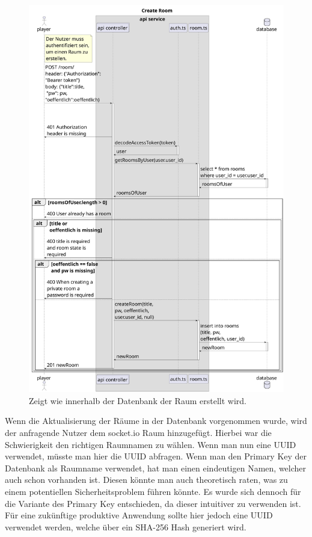 \documentclass[
]{article}
\begin{document}
\begin{figure}[H]
	\centering
	\includegraphics[width=\textwidth ]{resources/create_room.pdf}
	\caption{Zeigt wie innerhalb der Datenbank der Raum erstellt wird.}
	\label{fig:ablaufdiagramm-create_room}
\end{figure}

Wenn die Aktualisierung der Räume in der Datenbank vorgenommen wurde, wird der anfragende Nutzer dem socket.io Raum hinzugefügt.
Hierbei war die Schwierigkeit den richtigen Raumnamen zu wählen.
Wenn man nun eine UUID verwendet, müsste man hier die UUID abfragen. Wenn man den Primary Key der Datenbank als Raumname verwendet,
hat man einen eindeutigen Namen, welcher auch schon vorhanden ist. 
Diesen könnte man auch theoretisch raten, was zu einem potentiellen Sicherheitsproblem führen könnte.
Es wurde sich dennoch für die Variante des Primary Key entschieden, 
da dieser intuitiver zu verwenden ist. Für eine zukünftige produktive Anwendung sollte hier jedoch eine UUID 
verwendet werden, welche über ein SHA-256 Hash generiert wird.
\end{document}
